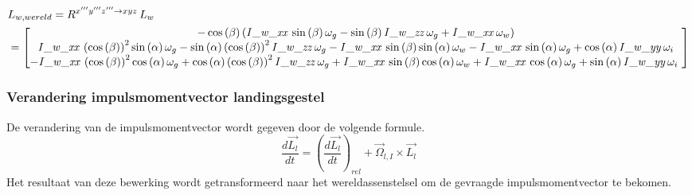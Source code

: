 \begin{align*}
&L_{w,wereld}=R^{x'''y'''z''' \rightarrow xyz}\,L_{w}\\
&=\begin{bmatrix}
-\cos \left( \beta \right)  \left( {\it I\_w\_xx}\,\sin \left( \beta \right) \omega_{g}-\sin \left( \beta\right) {\it I\_w\_zz}\,\omega_{g}+{\it I\_w\_xx}\,\omega_{w}
\right)
\\ 
{\it I\_w\_xx}\, \left( \cos \left( \beta \right)  \right) ^{2}\sin \left( \alpha \right) \omega_{g}-\sin\left( \alpha \right)  \left( \cos \left( \beta \right)  \right) ^{2}
{\it I\_w\_zz}\,\omega_{g}-{\it I\_w\_xx}\,\sin \left( \beta \right) \sin \left( \alpha \right) \omega_{w}-{\it I\_w\_xx}\,\sin \left( \alpha \right) \omega_{g}+\cos \left( \alpha \right) {\it I\_w\_yy}\,\omega_{i}
\\ 
-{\it I\_w\_xx}\, \left( \cos \left( \beta \right)  \right) ^{2}\cos \left( \alpha \right) \omega_{g}+\cos\left( \alpha \right)  \left( \cos \left( \beta \right)  \right) ^{2}
{\it I\_w\_zz}\,\omega_{g}+{\it I\_w\_xx}\,\sin \left( \beta \right) \cos \left( \alpha \right) \omega_{w}+{\it I\_w\_xx}\,\cos \left( \alpha \right) \omega_{g}+\sin \left( \alpha \right) {\it I\_w\_yy}\,\omega_{i}\
\end{bmatrix}
\end{align*}

\subsubsection{Verandering impulsmomentvector landingsgestel}
De verandering van de impulsmomentvector wordt gegeven door de volgende formule. 
\begin{equation*}
\frac{d\overrightarrow{L_{l}}}{dt}=\left(\frac{d\overrightarrow{L_{l}}}{dt}\right)_{rel}+\overrightarrow{\Omega}_{l,I}\times \overrightarrow{L_{l}}
\end{equation*}
Het resultaat van deze bewerking wordt getransformeerd naar het wereldassenstelsel om de gevraagde impulsmomentvector te bekomen.

